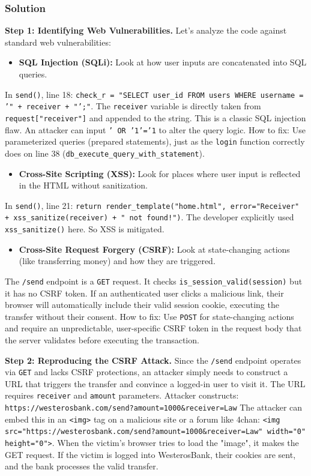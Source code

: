 \documentclass{article}
\begin{document}
\subsubsection*{Solution}
\textbf{Step 1: Identifying Web Vulnerabilities.}
Let's analyze the code against standard web vulnerabilities:
\begin{itemize}
    \item \textbf{SQL Injection (SQLi):} Look at how user inputs are concatenated into SQL queries.
\end{itemize}
In \texttt{send()}, line 18: \texttt{check\_r = "SELECT user\_id FROM users WHERE username = '" + receiver + "';"}. The \texttt{receiver} variable is directly taken from \texttt{request["receiver"]} and appended to the string. This is a classic SQL injection flaw. An attacker can input \texttt{' OR '1'='1} to alter the query logic.
How to fix: Use parameterized queries (prepared statements), just as the \texttt{login} function correctly does on line 38 (\texttt{db\_execute\_query\_with\_statement}).
\begin{itemize}
    \item \textbf{Cross-Site Scripting (XSS):} Look for places where user input is reflected in the HTML without sanitization.
\end{itemize}
In \texttt{send()}, line 21: \texttt{return render\_template("home.html", error="Receiver" + xss\_sanitize(receiver) + " not found!")}. The developer explicitly used \texttt{xss\_sanitize()} here. So XSS is mitigated.
\begin{itemize}
    \item \textbf{Cross-Site Request Forgery (CSRF):} Look at state-changing actions (like transferring money) and how they are triggered.
\end{itemize}
The \texttt{/send} endpoint is a \texttt{GET} request. It checks \texttt{is\_session\_valid(session)} but it has no CSRF token. If an authenticated user clicks a malicious link, their browser will automatically include their valid session cookie, executing the transfer without their consent.
How to fix: Use \texttt{POST} for state-changing actions and require an unpredictable, user-specific CSRF token in the request body that the server validates before executing the transaction.

\textbf{Step 2: Reproducing the CSRF Attack.}
Since the \texttt{/send} endpoint operates via \texttt{GET} and lacks CSRF protections, an attacker simply needs to construct a URL that triggers the transfer and convince a logged-in user to visit it.
The URL requires \texttt{receiver} and \texttt{amount} parameters.
Attacker constructs: \texttt{https://westerosbank.com/send?amount=1000\&receiver=Law}
The attacker can embed this in an \texttt{<img>} tag on a malicious site or a forum like 4chan: \texttt{<img src="https://westerosbank.com/send?amount=1000\&receiver=Law" width="0" height="0">}. When the victim's browser tries to load the "image", it makes the GET request. If the victim is logged into WesterosBank, their cookies are sent, and the bank processes the valid transfer.
\end{document}
